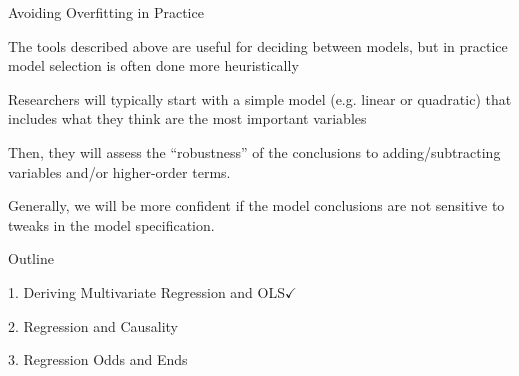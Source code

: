 \documentclass[11pt,english,handout]{beamer}
\newenvironment{wideitemize}{\itemize\addtolength{\itemsep}{10pt}}{\enditemize}
\begin{document}
\begin{frame}{Avoiding Overfitting in Practice}
	\begin{wideitemize}
		\item
		The tools described above are useful for deciding between models, but in practice model selection is often done more heuristically
		
		\pause
		\item
		Researchers will typically start with a simple model (e.g. linear or quadratic) that includes what they think are the most important variables
		
		\pause
		\item
		Then, they will assess the ``robustness'' of the conclusions to adding/subtracting variables and/or higher-order terms. 
		
		\pause
		\item
		Generally, we will be more confident if the model conclusions are not sensitive to tweaks in the model specification.

	\end{wideitemize}	
\end{frame}

	
	\begin{frame}{Outline}

	\textcolor{red!75!green!50!blue!25!gray}{1. Deriving Multivariate Regression and OLS}$\checkmark$
	\vspace{0.8cm}
	
	2. Regression and Causality
	\vspace{0.8cm}
	
	\textcolor{red!75!green!50!blue!25!gray}{3. Regression Odds and Ends}
	
	\end{frame}
\end{document}
